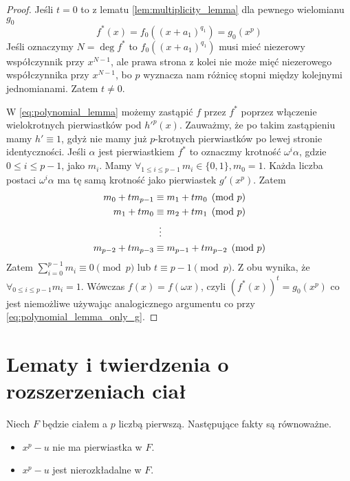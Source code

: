 \begin{proof}
  Jeśli $t=0$ to z lematu \ref{lem:multiplicity_lemma} dla pewnego wielomianu
  $g_0$
  \begin{equation}
   f^*(x) = f_0 \left(\left(x + a_1 \right)^{q_1} \right) = g_0 \left( x^p
  \right)
  \label{eq:polynomial_lemma_only_g}
  \end{equation}
  Jeśli oznaczymy $N = \deg f^*$ to $f_0 \left(\left(x + a_1 \right)^{q_1}
  \right)$ musi mieć niezerowy współczynnik przy $x^{N-1}$, ale prawa strona z
  kolei nie może mięć niezerowego współczynnika przy $x^{N-1}$, bo $p$ wyznacza
  nam różnicę stopni między kolejnymi jednomianami. Zatem $t \neq 0$.

  W \ref{eq:polynomial_lemma} możemy zastąpić $f$ przez $f^*$ poprzez włączenie
  wielokrotnych pierwiastków pod $h'^p(x)$. Zauważmy, że po takim zastąpieniu
  mamy $h' \equiv 1$, gdyż nie mamy już $p$-krotnych pierwiastków po lewej
  stronie identyczności. Jeśli $\alpha$ jest pierwiastkiem $f^*$ to oznaczmy
  krotność $\omega^i\alpha$, gdzie $0 \leq i \leq p - 1$, jako $m_i$. Mamy
  $\forall_{1 \leq i \leq p - 1} \, m_i \in \{0, 1\}, m_0 = 1$.  Każda liczba
  postaci $\omega^i\alpha$ ma tę samą krotność jako pierwiastek $g' \left( x^p
  \right)$. Zatem
  \begin{align*}
    m_0 + tm_{p-1} &\equiv m_1 + tm_0 \pmod{p}\\
    m_1 + tm_{0} &\equiv m_2 + tm_1 \pmod{p}\\
                 &\mathrel{\makebox[\widthof{=}]{\vdots}}\\
    m_{p-2} + tm_{p-3} &\equiv m_{p-1} + tm_{p-2} \pmod{p}
  \end{align*}
  Zatem $\sum_{i=0}^{p-1} m_i \equiv 0 \pmod{p}$ lub $t \equiv p-1 \pmod{p}$. Z
  obu wynika, że $\forall_{0 \leq i \leq p-1} m_i = 1$. Wówczas $f(x) = f(\omega
  x)$, czyli $\left( f^*(x) \right)^t = g_0 \left( x^p \right)$ co jest
  niemożliwe używając analogicznego argumentu co przy
  \ref{eq:polynomial_lemma_only_g}.
\end{proof}

\section{Lematy i twierdzenia o rozszerzeniach ciał}
\begin{theorem}
  Niech $F$ będzie ciałem a $p$ liczbą pierwszą. Następujące fakty są
  równoważne.

  \begin{itemize}
    \item $x^p - u$ nie ma pierwiastka w $F$.
    \item $x^p - u$ jest nierozkładalne w $F$.
  \end{itemize}
  \label{th:14_1_1}
\end{theorem}

